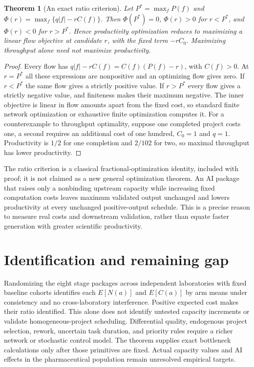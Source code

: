 \documentclass[11pt]{article}
\newtheorem{theorem}{Theorem}
\theoremstyle{definition}
\begin{document}
\begin{theorem}[An exact ratio criterion]
Let $P^*=\max_fP(f)$ and
$\Phi(r)=\max_f\{q|f|-r C(f)\}$. Then $\Phi(P^*)=0$, $\Phi(r)>0$ for $r<P^*$, and $\Phi(r)<0$ for $r>P^*$. Hence productivity optimization reduces to maximizing a linear flow objective at candidate $r$, with the fixed term $-rC_0$. Maximizing throughput alone need not maximize productivity.
\end{theorem}
\begin{proof}
Every flow has $q|f|-rC(f)=C(f)(P(f)-r)$, with $C(f)>0$. At $r=P^*$ all these expressions are nonpositive and an optimizing flow gives zero. If $r<P^*$ the same flow gives a strictly positive value. If $r>P^*$ every flow gives a strictly negative value, and finiteness makes their maximum negative. The inner objective is linear in flow amounts apart from the fixed cost, so standard finite network optimization or exhaustive finite optimization computes it. For a counterexample to throughput optimality, suppose one completed project costs one, a second requires an additional cost of one hundred, $C_0=1$ and $q=1$. Productivity is $1/2$ for one completion and $2/102$ for two, so maximal throughput has lower productivity.
\end{proof}
The ratio criterion is a classical fractional-optimization identity, included with proof; it is not claimed as a new general optimization theorem. An AI package that raises only a nonbinding upstream capacity while increasing fixed computation costs leaves maximum validated output unchanged and lowers productivity at every unchanged positive-output schedule. This is a precise reason to measure real costs and downstream validation, rather than equate faster generation with greater scientific productivity.

\section*{Identification and remaining gap}
Randomizing the eight stage packages across independent laboratories with fixed baseline cohorts identifies each $E[N(a)]$ and $E[C(a)]$ by arm means under consistency and no cross-laboratory interference. Positive expected cost makes their ratio identified. This alone does not identify untested capacity increments or validate homogeneous-project scheduling. Differential quality, endogenous project selection, rework, uncertain task duration, and priority rules require a richer network or stochastic control model. The theorem supplies exact bottleneck calculations only after those primitives are fixed. Actual capacity values and AI effects in the pharmaceutical population remain unresolved empirical targets.
\end{document}
